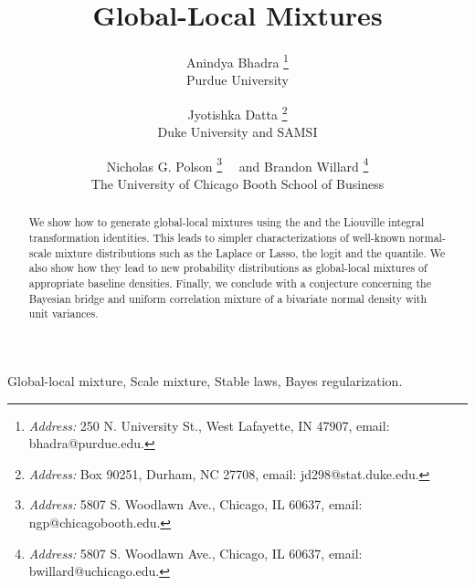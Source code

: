 \documentclass[letterpaper,11pt]{article}
\begin{document}



\title{\vspace{-1cm} Global-Local Mixtures}

\author{Anindya Bhadra  \footnote{{\em Address:} 250 N. University St., West Lafayette, IN 47907, email: bhadra@purdue.edu.} \\Purdue University
\and Jyotishka Datta  \footnote{{\em Address:} Box 90251, Durham, NC 27708, email: jd298@stat.duke.edu.}\\ Duke University and SAMSI\\
\and Nicholas G. Polson \footnote{{\em Address:} 5807 S. Woodlawn Ave., Chicago, IL 60637, email: ngp@chicagobooth.edu.}  \ \ and Brandon Willard \footnote{{\em Address:} 5807 S. Woodlawn Ave., Chicago, IL 60637, email: bwillard@uchicago.edu.} \\The University of Chicago Booth School of Business}

\maketitle
\begin{abstract}
\noindent 
We show how to generate global-local mixtures using the \CS and the Liouville integral transformation identities. This leads to simpler characterizations of well-known normal-scale mixture distributions such as the Laplace or Lasso, the logit and the quantile. We also show how they lead to new probability distributions as global-local mixtures of appropriate baseline densities. Finally, we conclude with a conjecture concerning the Bayesian bridge and uniform correlation mixture of a bivariate normal density with unit variances. 
\end{abstract}

Global-local mixture, Scale mixture, Stable laws, Bayes regularization.
\end{document}
